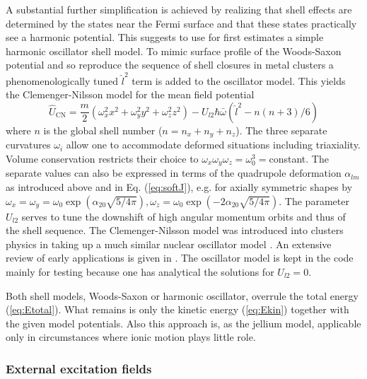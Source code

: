 \documentclass[final,1p]{elsarticle}
\begin{document}
A substantial further simplification is achieved by realizing that
shell effects are determined by the states near the Fermi surface and
that these states practically see a harmonic potential. This suggests
to use for first estimates a simple harmonic oscillator shell
model. To mimic surface profile of the Woods-Saxon potential and so
reproduce the sequence of shell closures in metal clusters
 a phenomenologically tuned $\hat{l}^2$ term is added to the
oscillator model.
This yields the Clemenger-Nilsson model for the mean field potential
\begin{equation} 
  \hat{U}_\mathrm{CN}
  =
  \frac{m}{2}\left(
  \omega_x^2x_{\mbox{}}^2+\omega_y^2y_{\mbox{}}^2+\omega_z^2z_{\mbox{}}^2
  \right)
  -
  U_{l2}\hbar\bar{\omega}\left(\hat{l}^2-n(n+3)/6\right)
\label{eq:CleNil}
\end{equation}
where $n$ is the global shell number ($n=n_x+n_y+n_z$). The three
separate curvatures $\omega_i$ allow one to accommodate deformed situations
including triaxiality. Volume conservation restricts their choice to
$\omega_x\omega_y\omega_z=\omega_0^3=$constant. The separate values
can also be expressed in terms of the quadrupole deformation
$\alpha_{lm}$ as introduced above and in Eq. (\ref{eq:softJ}),
e.g. for axially symmetric shapes by
%
$\omega_x=\omega_y=\omega_0\exp{(\alpha_{20}\sqrt{5/4\pi})},
 \omega_z=\omega_0\exp{(-2\alpha_{20}\sqrt{5/4\pi})}$.
%
The parameter $U_{l2}$ serves to tune the downshift of high angular
momentum orbits and thus of the shell sequence.
%
The Clemenger-Nilsson model was introduced into clusters physics in
\cite{Cle85} taking up a much similar nuclear oscillator model
\cite{Nil55}. An extensive review of early applications is given in
\cite{Hee93}. The oscillator model is kept in the code mainly for
testing because one has analytical the solutions for $U_{l2}=0$.

Both shell models, Woods-Saxon or harmonic oscillator, overrule the
total energy (\ref{eq:Etotal}). What remains is only the kinetic
energy (\ref{eq:Ekin}) together with the given model potentials.
Also this approach is, as the jellium model, applicable only in
circumstances where ionic motion plays little role.



\subsubsection{External excitation fields}
\label{sec:laser}
\end{document}
